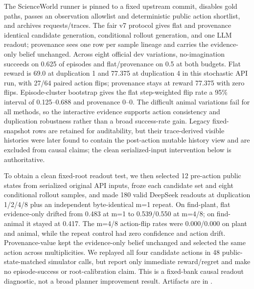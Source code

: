 \documentclass[10pt]{article}
\begin{document}
The ScienceWorld runner is pinned to a fixed upstream commit, disables gold paths, passes an observation allowlist and deterministic public action shortlist, and archives requests/traces. The fair v7 protocol gives flat and provenance identical candidate generation, conditional rollout generation, and one LLM readout; provenance sees one row per sample lineage and carries the evidence-only belief unchanged. Across eight official dev variations, no-imagination succeeds on 0.625 of episodes and flat/provenance on 0.5 at both budgets. Flat reward is 69.0 at duplication 1 and 77.375 at duplication 4 in this stochastic API run, with 27/64 paired action flips; provenance stays at reward 77.375 with zero flips. Episode-cluster bootstrap gives the flat step-weighted flip rate a 95\% interval of 0.125--0.688 and provenance 0--0. The difficult animal variations fail for all methods, so the interactive evidence supports action consistency and duplication robustness rather than a broad success-rate gain. Legacy fixed-snapshot rows are retained for auditability, but their trace-derived visible histories were later found to contain the post-action mutable history view and are excluded from causal claims; the clean serialized-input intervention below is authoritative.

To obtain a clean fixed-root readout test, we then selected 12 pre-action public states from serialized original API inputs, froze each candidate set and eight conditional rollout samples, and made 180 valid DeepSeek readouts at duplication 1/2/4/8 plus an independent byte-identical m=1 repeat. On find-plant, flat evidence-only \texttt{} drifted from 0.483 at m=1 to 0.539/0.550 at m=4/8; on find-animal it stayed at 0.417. The m=4/8 action-flip rates were 0.000/0.000 on plant and animal, while the repeat control had zero confidence and action drift. Provenance-value kept the evidence-only belief unchanged and selected the same action across multiplicities. We replayed all four candidate actions in 48 public-state-matched simulator calls, but report only immediate reward/regret and make no episode-success or root-calibration claim. This is a fixed-bank causal readout diagnostic, not a broad planner improvement result. Artifacts are in \texttt{}.
\end{document}
